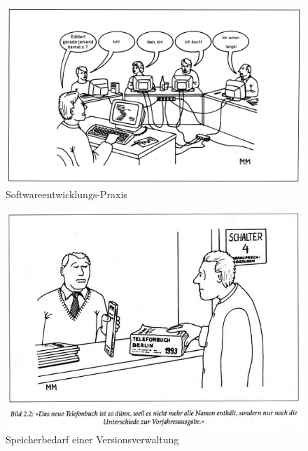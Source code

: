 \begin{figure}[htbp]
	\centering
	\includegraphics[scale=1.0]{images/vv-personen.jpg}
	\caption{Softwareentwicklungs-Praxis \citep[Bild 2.1]{Herold1995}}
	\label{fig:vv-personen}
\end{figure}



\begin{figure}[htbp]
	\centering
	\includegraphics[scale=1.0]{images/vv-speicherbedarf.jpg}
	\caption{Speicherbedarf einer Versionsverwaltung \citep[Bild 2.2]{Herold1995}}
	\label{fig:vv-speicherbedarf}
\end{figure}



\label{sec:tech-Versionsverwaltung-ende}